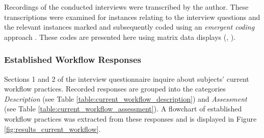 
Recordings of the conducted interviews were transcribed by the author. These
transcriptions were examined for instances relating to the interview questions
and the relevant instances marked and subsequently coded using an
\textit{emergent coding} approach \citep[p.304]{lazar2017}. These codes are
presented here using matrix data displays (\citet[p.254]{saldana2015},
\citet{henwood2003}).





\subsubsection{Established Workflow Responses}
\label{subsubsec:results_established_workflow}
Sections 1 and 2 of the interview questionnaire inquire about subjects' current
workflow practices. Recorded responses are grouped into the categories
\textit{Description} (see Table \ref{table:current_workflow_description}) and
\textit{Assessment} (see Table \ref{table:current_workflow_assessment}). A
flowchart of established workflow practices was extracted from these responses
and is displayed in Figure \ref{fig:results_current_workflow}.

